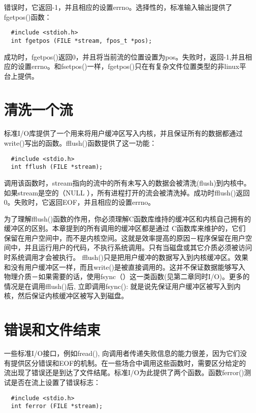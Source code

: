 错误时，它返回-1，并且相应的设置errno。选择性的，标准输入输出提供了fgetpos()函数：
\begin{lstlisting}
  #include <stdioh.h>
  int fgetpos (FILE *stream, fpos_t *pos);
\end{lstlisting}

成功时，fgetpos()返回0，并且将当前流的位置设置为pos。失败时，返回-1,并且相应的设置errno。和fsetpos()一样，fgetpos()只在有复杂文件位置类型的非linux平台上提供。

\section{清洗一个流}

标准I/O库提供了一个用来将用户缓冲区写入内核，并且保证所有的数据都通过write()写出的函数。fflush()函数提供了这一功能：
\begin{lstlisting}
  #include <stdio.h>
  int fflush (FILE *stream);
\end{lstlisting}

调用该函数时，stream指向的流中的所有未写入的数据会被清洗(flush)到内核中。如果stream是空的（NULL ），所有进程打开的流会被清洗掉。成功时fflush()返回0。失败时，它返回EOF，并且相应的设置errno。

为了理解fflush()函数的作用，你必须理解C函数库维持的缓冲区和内核自己拥有的缓冲区的区别。本章提到的所有调用的缓冲区都是通过 C函数库来维护的，它们保留在用户空间中，而不是内核空间。这就是效率提高的原因－程序保留在用户空间中，并且运行用户的代码，不执行系统调用。只有当磁盘或其它介质必须被访问时系统调用才会被执行。 fflush()只是把用户缓冲的数据写入到内核缓冲区。效果和没有用户缓冲区一样，而且write()是被直接调用的。这并不保证数据能够写入物理介质－如果需要的话，使用fsync（）这一类函数(见第二章同时I/O)。更多的情况是在调用fflush()后, 立即调用fsync(): 就是说先保证用户缓冲区被写入到内核，然后保证内核缓冲区被写入到磁盘。

\section{错误和文件结束}

一些标准I/O接口，例如fread(), 向调用者传递失败信息的能力很差，因为它们没有提供区分错误和EOF的机制。在一些场合中调用这些函数时，需要区分给定的流出现了错误还是到达了文件结尾。标准I/O为此提供了两个函数。函数ferror()测试是否在流上设置了错误标志：
\begin{lstlisting}
  #include <stdio.h>
  int ferror (FILE *stream);
\end{lstlisting}


